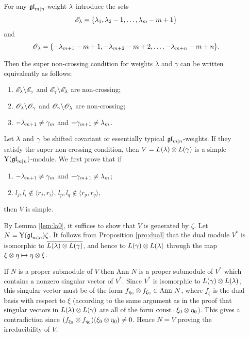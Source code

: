 \documentclass[12pt]{amsart}
\begin{document}
For any $\mathfrak{gl}_{m|n}$-weight $\lambda$
introduce the sets
\[
\mathscr{E}_{\lambda}=\{\lambda_1,\lambda_2-1,\ldots,\lambda_m-m+1\}
\]
and
\[
\mathscr{O}_{\lambda}=\{-\lambda_{m+1}-m+1,-\lambda_{m+2}-m+2,\ldots,-\lambda_{m+n}-m+n\}.
\]

Then the super non-crossing condition for weights $\lambda$ and $\gamma$
 can be written equivalently as follows:

\begingroup
\begin{enumerate}
\item $\mathscr{E}_{\lambda}\backslash \mathscr{E}_{\gamma}$ and $\mathscr{E}_{\gamma}\backslash \mathscr{E}_{\lambda}$ are non-crossing;
\item $\mathscr{O}_{\lambda}\backslash \mathscr{O}_{\gamma}$ and $\mathscr{O}_{\gamma}\backslash \mathscr{O}_{\lambda}$ are non-crossing;
\item $-\lambda_{m+1}\neq \gamma_m$ and $-\gamma_{m+1}\neq \lambda_m$.
\end{enumerate}
\addtocounter{thm}{-1}
\endgroup

\bth\label{thm:scon}
Let $\lambda$ and $\gamma$ be shifted covariant or essentially typical $\mathfrak{gl}_{m|n}$-weights.
If they satisfy the super non-crossing condition, then $V=L(\lambda)\otimes L(\gamma)$ is a simple ${\rm Y}(\mathfrak{gl}_{m|n})$-module.
\eth
\bpf
We first prove that if
\begin{enumerate}
\item  $-\lambda_{m+1}\neq\gamma_m$ and $-\gamma_{m+1}\neq \lambda_m$;
\item  $l_j,l_i\notin \langle r_j,r_i\rangle$, $l_p,l_q\notin\langle r_p,r_q\rangle$,
\end{enumerate}
then $V$ is simple.

By Lemma \ref{lem:la0}, it suffices to show that $V$ is generated by $\zeta$.
Let $N={\rm Y}(\mathfrak{gl}_{m|n})\zeta$. It follows from Proposition \ref{pro:dual} that  the dual module $V^*$
is isomorphic to $\overline{L(\lambda)\otimes L(\gamma)}$, and hence to $L(\gamma)\otimes L(\lambda)$ through the map $\xi\otimes \eta\mapsto \eta\otimes\xi$.

If $N$ is a proper submodule of $V$ then $\text{Ann }{N}$ is a proper submodule of $V^*$ which contains a nonzero singular vector of $V^*$. Since $V^*$ is isomorphic to $L(\gamma)\otimes L(\lambda)$, this singular vector must be of the form $f_{\eta_0}\otimes f_{\xi_0}\in \text{Ann }{N}$, where $f_{\xi}$ is the dual basis with respect to $\xi$ (according to the same argument as in the proof  that  singular vectors in $L(\lambda)\otimes L(\gamma)$ are all of the form $\rm{const}\cdot \xi_0\otimes \eta_0$).  This gives a contradiction since $(f_{\xi_0}\otimes f_{\eta_0})(\xi_0\otimes \eta_0)\neq 0$.   Hence $N=V$ proving the irreducibility of $V$.
\end{document}
